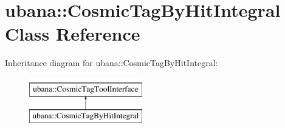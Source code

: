 \hypertarget{classubana_1_1CosmicTagByHitIntegral}{\section{ubana\-:\-:\-Cosmic\-Tag\-By\-Hit\-Integral \-Class \-Reference}
\label{classubana_1_1CosmicTagByHitIntegral}
}
\-Inheritance diagram for ubana\-:\-:\-Cosmic\-Tag\-By\-Hit\-Integral\-:\begin{figure}[H]
\begin{center}
\leavevmode
\includegraphics[height=2.000000cm]{classubana_1_1CosmicTagByHitIntegral}
\end{center}
\end{figure}
